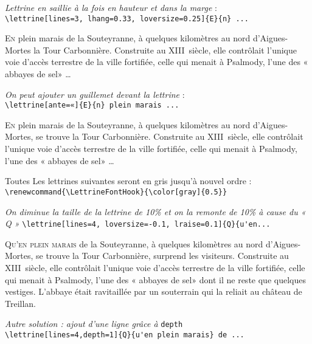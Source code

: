 \documentclass[12pt,a4paper]{article}
\begin{document}
\vspace{\baselineskip}
\textit{Lettrine en saillie à la fois en hauteur et dans la marge} :\\
\verb+\lettrine[lines=3, lhang=0.33, loversize=0.25]{E}{n} ...+

\lettrine[lines=3, lhang=0.33, loversize=0.25]{E}{n}
plein marais de la Souteyranne,
à quelques kilomètres au nord d'Aigues-Mortes la Tour Carbonnière.
Construite au XIII\ieme~siècle, elle contrôlait l'unique voie d'accès
terrestre de la ville fortifiée, celle qui menait à Psalmody,
l'une des « abbayes de sel» \dots

\vspace{\baselineskip}
\textit{On peut ajouter un guillemet devant la lettrine} :\\
\verb+\lettrine[ante=«]{E}{n} plein marais ...+

\lettrine[ante=«]{E}{n} plein marais de la Souteyranne,
à quelques kilomètres au nord d'Aigues-Mortes, se trouve
la Tour Carbonnière.
Construite au XIII\ieme~siècle, elle contrôlait l'unique voie d'accès
terrestre de la ville fortifiée, celle qui menait à Psalmody,
l'une des « abbayes de sel» \dots

\newpage
Toutes Les lettrines suivantes  seront en gris jusqu'à nouvel ordre : \\
\verb+\renewcommand{\LettrineFontHook}{\color[gray]{0.5}}+
\renewcommand{\LettrineFontHook}{\color[gray]{0.5}}

\vspace{.5\baselineskip}
\textit{On diminue la taille de la lettrine de 10\% et on
la remonte de 10\%  à cause du « Q »}
\verb+\lettrine[lines=4, loversize=-0.1, lraise=0.1]{Q}{u'en...+

\lettrine[lines=4, loversize=-0.1, lraise=0.1]{Q}{u'en plein marais}
 de la Souteyranne, à quelques kilomètres au nord d'Aigues-Mortes,
se trouve la Tour Carbonnière, surprend les visiteurs.
Construite au XIII\ieme~siècle, elle contrôlait l'unique voie d'accès
terrestre de la ville fortifiée, celle qui menait à Psalmody,
l'une des « abbayes de sel» dont il ne reste que quelques vestiges.
L'abbaye était ravitaillée par un souterrain qui
la reliait au château de Treillan.

\vspace{.5\baselineskip}
\textit{Autre solution : ajout d’une ligne grâce à} \verb+depth+\\
\verb+\lettrine[lines=4,depth=1]{Q}{u'en plein marais} de ...+
\end{document}
